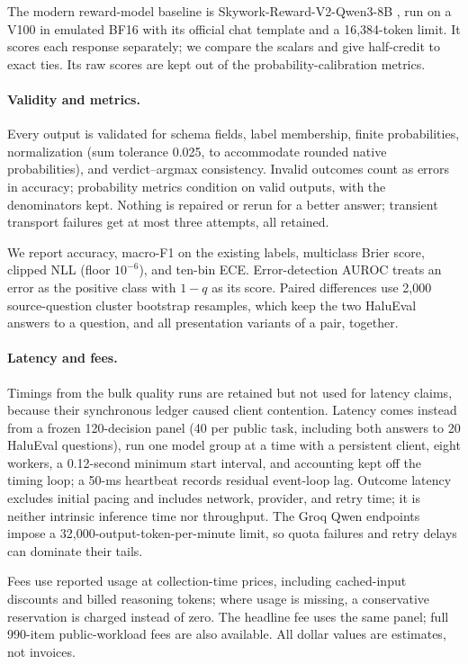 \documentclass[11pt]{article}
\begin{document}
The modern reward-model baseline is Skywork-Reward-V2-Qwen3-8B \citep{skywork}, run on a V100 in emulated BF16 with its official chat template and a 16,384-token limit. It scores each response separately; we compare the scalars and give half-credit to exact ties. Its raw scores are kept out of the probability-calibration metrics.

\paragraph{Validity and metrics.}
Every output is validated for schema fields, label membership, finite probabilities, normalization (sum tolerance 0.025, to accommodate rounded native probabilities), and verdict--argmax consistency. Invalid outcomes count as errors in accuracy; probability metrics condition on valid outputs, with the denominators kept. Nothing is repaired or rerun for a better answer; transient transport failures get at most three attempts, all retained.

We report accuracy, macro-F1 on the existing labels, multiclass Brier score, clipped NLL (floor $10^{-6}$), and ten-bin ECE. Error-detection AUROC treats an error as the positive class with $1-q$ as its score. Paired differences use 2,000 source-question cluster bootstrap resamples, which keep the two HaluEval answers to a question, and all presentation variants of a pair, together.

\paragraph{Latency and fees.}
Timings from the bulk quality runs are retained but not used for latency claims, because their synchronous ledger caused client contention. Latency comes instead from a frozen 120-decision panel (40 per public task, including both answers to 20 HaluEval questions), run one model group at a time with a persistent client, eight workers, a 0.12-second minimum start interval, and accounting kept off the timing loop; a 50-ms heartbeat records residual event-loop lag. Outcome latency excludes initial pacing and includes network, provider, and retry time; it is neither intrinsic inference time nor throughput. The Groq Qwen endpoints impose a 32,000-output-token-per-minute limit, so quota failures and retry delays can dominate their tails.

Fees use reported usage at collection-time prices, including cached-input discounts and billed reasoning tokens; where usage is missing, a conservative reservation is charged instead of zero. The headline fee uses the same panel; full 990-item public-workload fees are also available. All dollar values are estimates, not invoices.
\end{document}
